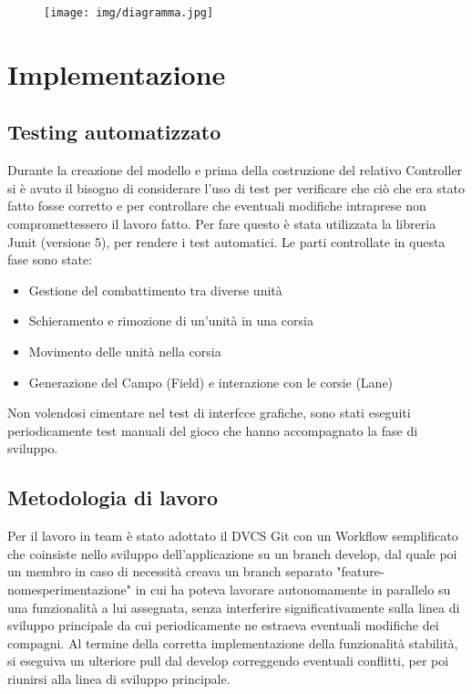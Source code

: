 \documentclass[a4paper,12pt]{report}
\begin{document}
\begin{figure}[H]
	\centering{}
	\texttt{[image: img/diagramma.jpg]}
	\label{img:diagramma}
\end{figure}

\chapter{Implementazione}

\section{Testing automatizzato}
Durante la creazione del modello e prima della costruzione del relativo Controller si è avuto 
il bisogno di considerare l’uso di test per verificare che ciò che era stato fatto fosse corretto
e per controllare che eventuali modifiche intraprese non compromettessero il lavoro fatto.
Per fare questo è stata utilizzata la libreria Junit (versione 5), per rendere i test automatici.
Le parti controllate in questa fase sono state:
\begin{itemize}
	\item Gestione del combattimento tra diverse unità
	\item Schieramento e rimozione di un'unità in una corsia
	\item Movimento delle unità nella corsia
	\item Generazione del Campo (Field) e interazione con le corsie (Lane)
\end{itemize}

Non volendosi cimentare nel test di interfcce grafiche, sono stati eseguiti periodicamente test manuali 
del gioco che hanno accompagnato la fase di sviluppo.

\section{Metodologia di lavoro}
Per il lavoro in team è stato adottato il DVCS Git con un Workflow semplificato che coinsiste nello sviluppo 
dell'applicazione su un branch develop, dal quale poi un membro in caso di necessità creava un 
branch separato "feature-nomesperimentazione" in cui ha poteva lavorare autonomamente in parallelo su una 
funzionalità a lui assegnata, senza interferire significativamente sulla linea di sviluppo principale
da cui periodicamente ne estraeva eventuali modifiche dei compagni.
%
Al termine della corretta implementazione della funzionalità stabilità, si eseguiva un ulteriore pull dal develop
correggendo eventuali conflitti, per poi riunirsi alla linea di sviluppo principale.
\end{document}
